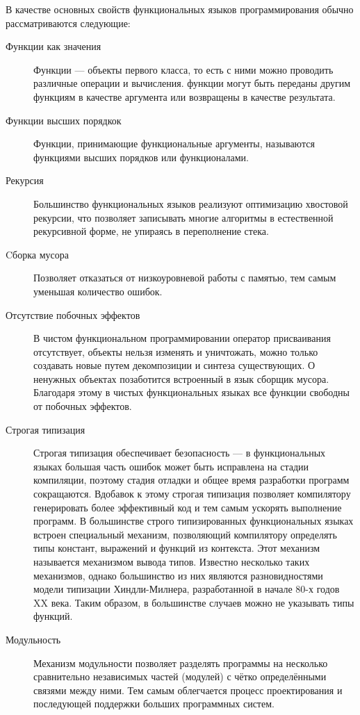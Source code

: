 \documentclass[a4paper]{article}
\begin{document}
В качестве основных свойств функциональных языков программирования
обычно рассматриваются следующие:
\begin{description}
\item[Функции как значения] Функции --- объекты первого класса, то
  есть с ними можно проводить различные операции и вычисления. функции
  могут быть переданы другим функциям в качестве аргумента или
  возвращены в качестве результата.
\item[Функции высших порядкок] Функции, принимающие
  функциональные аргументы, называются функциями высших порядков или
  функционалами.
\item[Рекурсия] Большинство функциональных языков реализуют оптимизацию
  хвостовой рекурсии, что позволяет записывать многие алгоритмы в
  естественной рекурсивной форме, не упираясь в переполнение стека.
\item[Cборка мусора] Позволяет отказаться от низкоуровневой работы с
  памятью, тем самым уменьшая количество ошибок.
\item[Отсутствие побочных эффектов] В чистом функциональном
  программировании оператор присваивания отсутствует, объекты нельзя
  изменять и уничтожать, можно только создавать новые путем
  декомпозиции и синтеза существующих. О ненужных объектах позаботится
  встроенный в язык сборщик мусора. Благодаря этому в чистых
  функциональных языках все функции свободны от побочных эффектов.
\item[Строгая типизация] Строгая типизация обеспечивает безопасность
  --- в функциональных языках большая часть ошибок может быть
  исправлена на стадии компиляции, поэтому стадия отладки и общее
  время разработки программ сокращаются. Вдобавок к этому строгая
  типизация позволяет компилятору генерировать более эффективный код и
  тем самым ускорять выполнение программ. В большинстве строго типизированных
  функциональных языках встроен специальный механизм, позволяющий
  компилятору определять типы констант, выражений и функций из
  контекста. Этот механизм называется механизмом вывода типов.
  Известно несколько таких механизмов, однако большинство из них
  являются разновидностями модели типизации Хиндли-Милнера,
  разработанной в начале 80-х годов XX века. Таким образом, в
  большинстве случаев можно не указывать типы функций.
\item[Модульность] Механизм модульности позволяет разделять программы
  на несколько сравнительно независимых частей (модулей) с чётко
  определёнными связями между ними. Тем самым облегчается процесс
  проектирования и последующей поддержки больших программных систем.

\end{description}
\end{document}
